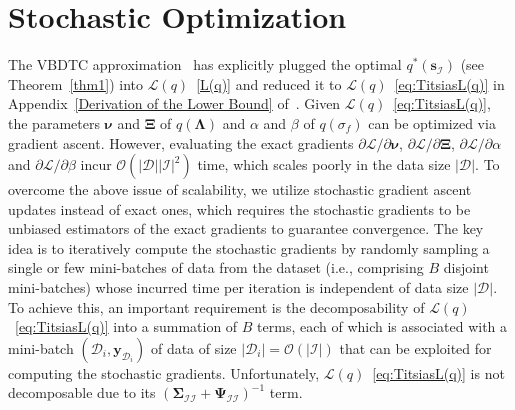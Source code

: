 \documentclass[conference]{IEEEtran}
\begin{document}
\section{Stochastic Optimization}	
	\label{Stochastic Variational Inference for GPR}%
	The VBDTC approximation~\cite{Titsias13} has explicitly plugged the optimal $q^*(\mathbf{s}_\mathcal{I})$ (see Theorem~\ref{thm1}) into $\mathcal{L}(q)$~\eqref{L(q)} and reduced it to $\mathcal{L}(q)$~\eqref{eq:TitsiasL(q)} in Appendix~\ref{Derivation of the Lower Bound} of~\cite{HaibinAPP}. Given $\mathcal{L}(q)$~\eqref{eq:TitsiasL(q)}, the parameters $\boldsymbol{\nu}$ and $\mathbf{\Xi}$ of $q(\mathbf{\Lambda})$ and $\alpha$ and $\beta$ of $q(\sigma_f)$ can be optimized via gradient ascent. However, evaluating the exact gradients
	$\partial\mathcal{L}/\partial\boldsymbol{\nu}$, $\partial\mathcal{L}/\partial\mathbf{\Xi}$, $\partial\mathcal{L}/\partial \alpha$ and $\partial\mathcal{L}/\partial \beta$  
	incur $\mathcal{O}(|\mathcal{D}||\mathcal{I}|^2)$ time,
	which scales poorly in the data size $|\mathcal{D}|$. To overcome the above issue of scalability, we utilize stochastic gradient ascent updates instead of exact ones, which requires the stochastic gradients to be unbiased estimators of the exact gradients to guarantee convergence.
	The key idea is to iteratively compute the stochastic gradients by randomly sampling a single or few mini-batches of data from the dataset (i.e., comprising $B$ disjoint mini-batches) whose incurred time per iteration is independent of data size $|\mathcal{D}|$.
	To achieve this, an important requirement is the decomposability of $\mathcal{L}(q)$~\eqref{eq:TitsiasL(q)} into a summation of $B$ terms, each of which is associated with a mini-batch $(\mathcal{D}_i, \mathbf{y}_{\mathcal{D}_i})$ of data of size $|\mathcal{D}_i|=\mathcal{O}(|\mathcal{I}|)$	
that can be exploited for computing the stochastic gradients.
	Unfortunately, $\mathcal{L}(q)$~\eqref{eq:TitsiasL(q)} is not decomposable due to its $(\mathbf{\Sigma}_\mathcal{II}+\mathbf{\Psi}_\mathcal{II})^{-1}$ term.			
\end{document}
